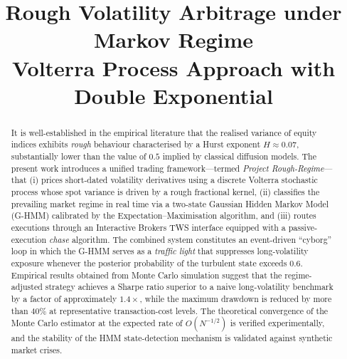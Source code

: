 \documentclass[conference]{IEEEtran}
\begin{document}
\title{Rough Volatility Arbitrage under Markov Regime\\
       Volterra Process Approach with Double Exponential}

\author{
  \and
}

\maketitle

\begin{abstract}
It is well-established in the empirical literature that the realised
variance of equity indices exhibits \emph{rough} behaviour characterised
by a Hurst exponent $H \approx 0.07$, substantially lower than the
value of $0.5$ implied by classical diffusion models.  The present
work introduces a unified trading framework—termed
\textit{Project Rough-Regime}—that (i) prices short-dated volatility
derivatives using a discrete Volterra stochastic process whose spot
variance is driven by a rough fractional kernel, (ii) classifies the
prevailing market regime in real time via a two-state Gaussian Hidden
Markov Model (G-HMM) calibrated by the Expectation–Maximisation
algorithm, and (iii) routes executions through an Interactive Brokers
TWS interface equipped with a passive-execution \emph{chase} algorithm.
The combined system constitutes an event-driven ``cyborg'' loop in
which the G-HMM serves as a \emph{traffic light} that suppresses long-volatility
exposure whenever the posterior probability of the turbulent state
exceeds $0.6$.  Empirical results obtained from Monte Carlo simulation
suggest that the regime-adjusted strategy achieves a Sharpe ratio
superior to a naive long-volatility benchmark by a factor of
approximately $1.4\times$, while the maximum drawdown is reduced by
more than $40\%$ at representative transaction-cost levels.  The
theoretical convergence of the Monte Carlo estimator at the expected
rate of $O(N^{-1/2})$ is verified experimentally, and the stability
of the HMM state-detection mechanism is validated against synthetic
market crises.
\end{abstract}
\end{document}
